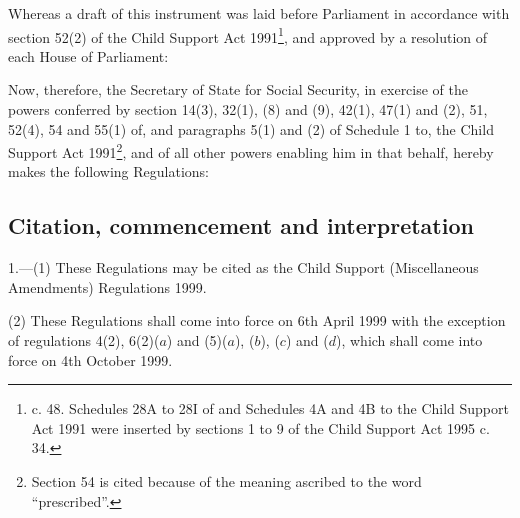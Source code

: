 \documentclass[12pt,a4paper]{article}
\title{\regstitle}
\author{S.I. 1999 No. 977}
\date{Made 25th March 1999\\Coming into force\\
Regulations 1--3, 4(1), (3) and (4), 5, 6(1), (2)($b$), (3), (4), (5)($e$), ($f$), ($g$) and ($h$), (6), (7) and 7: 6th April 1999\\
Regulations 4(2) and 6(2)($a$), (5)($a$), ($b$), ($c$) and ($d$): 4th October 1999 }
\begin{document}
\maketitle

\noindent
Whereas a draft of this instrument was laid before Parliament in accordance with section 52(2) of the Child Support Act 1991\footnote{ c. 48. Schedules 28A to 28I of and Schedules 4A and 4B to the Child Support Act 1991 were inserted by sections 1 to 9 of the Child Support Act 1995 c. 34.}, and approved by a resolution of each House of Parliament:

 Now, therefore, the Secretary of State for Social Security, in exercise of the powers conferred by section 14(3), 32(1), (8) and (9), 42(1), 47(1) and (2), 51, 52(4), 54 and 55(1) of, and paragraphs 5(1) and (2) of Schedule 1 to, the Child Support Act 1991\footnote{\frenchspacing Section 54 is cited because of the meaning ascribed to the word “prescribed”.}, and of all other powers enabling him in that behalf, hereby makes the following Regulations:

{\sloppy

\tableofcontents

}

\bigskip

\setcounter{secnumdepth}{-2}

\subsection[1. Citation, commencement and interpretation]{Citation, commencement and interpretation}

1.—(1) These Regulations may be cited as the Child Support (Miscellaneous Amendments) Regulations 1999.

(2) These Regulations shall come into force on 6th April 1999 with the exception of regulations 4(2), 6(2)($a$) and (5)($a$), ($b$), ($c$) and ($d$), which shall come into force on 4th October 1999.
\end{document}
